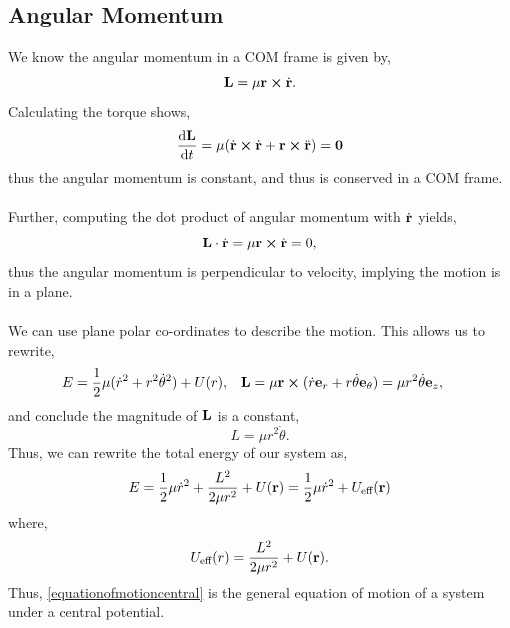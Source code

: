 \documentclass{book}
\begin{document}
\subsection{Angular Momentum}
We know the angular momentum in a COM frame is given by,
\begin{equation}
    \vb{L} = \mu\vb{r} \cross \Dot{\vb{r}}.
\end{equation}
Calculating the torque shows,
\begin{equation}
    \dv{\vb{L}}{t} = \mu(\Dot{\vb{r}}\cross\Dot{\vb{r}} + \vb{r}\cross\Ddot{\vb{r}}) = \vb{0}
\end{equation}
thus the angular momentum is constant, and thus is conserved in a COM frame. \\\\
Further, computing the dot product of angular momentum with $\Dot{\vb{r}}$ yields,
\begin{equation}
    \vb{L}\cdot\Dot{\vb{r}} = \mu\vb{r}\cross\Dot{\vb{r}} = 0,
\end{equation}
thus the angular momentum is perpendicular to velocity, implying the motion is in a plane. \\\\
We can use plane polar co-ordinates to describe the motion. This allows us to rewrite,
\begin{align}
    E &= \frac{1}{2}\mu(\Dot{r}^2 + r^2\Dot{\theta}^2) + U(r), & \vb{L} & = \mu\vb{r}\cross(\Dot{r}\vb{e}_{r} + r\Dot{\theta}\vb{e}_{\theta}) = \mu r^2 \Dot{\theta} \vb{e}_z,
\end{align}
and conclude the magnitude of $\vb{L}$ is a constant,
\begin{equation}
    L = \mu r^2 \Dot{\theta}.
\end{equation}
Thus, we can rewrite the total energy of our system as,
\begin{equation}
    E = \frac{1}{2}\mu \Dot{r}^2 + \frac{L^2}{2\mu r^2} + U(\vb{r}) = \frac{1}{2}\mu \Dot{r}^2 + U_{\text{eff}}(\vb{r}) \label{equationofmotioncentral}
\end{equation}
where,
\begin{equation}
    U_{\text{eff}}(r) = \frac{L^2}{2\mu r^2} + U(\vb{r}).\label{effectivepotential}
\end{equation}
Thus, \eqref{equationofmotioncentral} is the general equation of motion of a system under a central potential.
\end{document}

